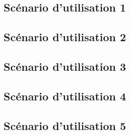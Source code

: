 




\subsection{Scénario d'utilisation 1}
\paragraph{}

\subsection{Scénario d'utilisation 2}
\paragraph{}

\subsection{Scénario d'utilisation 3}
\paragraph{}

\subsection{Scénario d'utilisation 4}
\paragraph{}

\subsection{Scénario d'utilisation 5}
\paragraph{}

